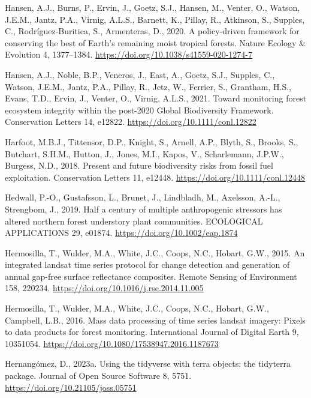 \documentclass[
]{agujournal2019}
\newlength{\cslhangindent}
\newenvironment{CSLReferences}[2] %
 {\begin{list}{}{%
  \setlength{\itemindent}{0pt}
  \setlength{\leftmargin}{0pt}
  \setlength{\parsep}{0pt}
  \ifodd #1
   \setlength{\leftmargin}{\cslhangindent}
   \setlength{\itemindent}{-1\cslhangindent}
  \fi
  \setlength{\itemsep}{#2\baselineskip}}}
 {\end{list}}
\begin{document}
\begin{CSLReferences}{1}{0}
Hansen, A.J., Burns, P., Ervin, J., Goetz, S.J., Hansen, M., Venter, O.,
Watson, J.E.M., Jantz, P.A., Virnig, A.L.S., Barnett, K., Pillay, R.,
Atkinson, S., Supples, C., Rodríguez-Buritica, S., Armenteras, D., 2020.
A policy-driven framework for conserving the best of Earth{'}s remaining
moist tropical forests. Nature Ecology \& Evolution 4, 1377--1384.
\url{https://doi.org/10.1038/s41559-020-1274-7}

Hansen, A.J., Noble, B.P., Veneros, J., East, A., Goetz, S.J., Supples,
C., Watson, J.E.M., Jantz, P.A., Pillay, R., Jetz, W., Ferrier, S.,
Grantham, H.S., Evans, T.D., Ervin, J., Venter, O., Virnig, A.L.S.,
2021. Toward monitoring forest ecosystem integrity within the post-2020
Global Biodiversity Framework. Conservation Letters 14, e12822.
\url{https://doi.org/10.1111/conl.12822}

Harfoot, M.B.J., Tittensor, D.P., Knight, S., Arnell, A.P., Blyth, S.,
Brooks, S., Butchart, S.H.M., Hutton, J., Jones, M.I., Kapos, V.,
Scharlemann, J.P.W., Burgess, N.D., 2018. Present and future
biodiversity risks from fossil fuel exploitation. Conservation Letters
11, e12448. \url{https://doi.org/10.1111/conl.12448}

Hedwall, P.-O., Gustafsson, L., Brunet, J., Lindbladh, M., Axelsson,
A.-L., Strengbom, J., 2019. Half a century of multiple anthropogenic
stressors has altered northern forest understory plant communities.
ECOLOGICAL APPLICATIONS 29, e01874.
\url{https://doi.org/10.1002/eap.1874}

Hermosilla, T., Wulder, M.A., White, J.C., Coops, N.C., Hobart, G.W.,
2015. An integrated landsat time series protocol for change detection
and generation of annual gap-free surface reflectance composites. Remote
Sensing of Environment 158, 220234.
\url{https://doi.org/10.1016/j.rse.2014.11.005}

Hermosilla, T., Wulder, M.A., White, J.C., Coops, N.C., Hobart, G.W.,
Campbell, L.B., 2016. Mass data processing of time series landsat
imagery: Pixels to data products for forest monitoring. International
Journal of Digital Earth 9, 10351054.
\url{https://doi.org/10.1080/17538947.2016.1187673}

Hernangómez, D., 2023a. Using the tidyverse with terra objects: the
tidyterra package. Journal of Open Source Software 8, 5751.
\url{https://doi.org/10.21105/joss.05751}


\end{CSLReferences}
\end{document}
